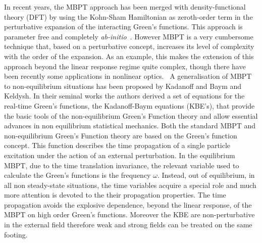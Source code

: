 In recent years, the MBPT approach has been merged with density-functional theory (DFT) by using the Kohn-Sham Hamiltonian as zeroth-order term in the
perturbative expansion of the interacting Green's functions. This approach is parameter free and completely \emph{ab-initio}~\cite{Onida}.  
However MBPT is a very cumbersome technique that, based on a perturbative concept, increases its level of complexity with
the order of the expansion. As an example, this makes the extension of this approach beyond the linear response regime quite complex, though there have been recently some applications in nonlinear optics.~\cite{Chang2002,Leitsmann2005,PhysRevB.82.235201}
A generalisation of MBPT to non-equilibrium situations has been proposed by Kadanoff and Baym and Keldysh\cite{kadanoffbaym}. 
In their seminal works the authors derived a set of equations for the real-time Green's functions, the Kadanoff-Baym equations (KBE's), that provide the basic tools of the non-equilibrium Green's Function theory and allow essential advances in non equilibrium statistical mechanics\cite{kadanoffbaym}.   
Both the standard MBPT and non-equilibrium Green's Function theory are based on
the Green's function concept. This function describes the time propagation of a single particle excitation under the action of an external perturbation.  
In the equilibrium MBPT, due to the time translation invariance,
the relevant variable used to calculate the Green's functions is the frequency $\omega$. Instead, out of equilibrium, in all non steady-state situations, the time variables acquire a special role and much more attention is devoted to the their propagation properties. 
The time propagation avoids the explosive dependence, beyond the linear response, of the MBPT on high order Green's functions. Moreover the KBE are
non-perturbative in the external field therefore weak and strong fields can be treated on the same footing. 

